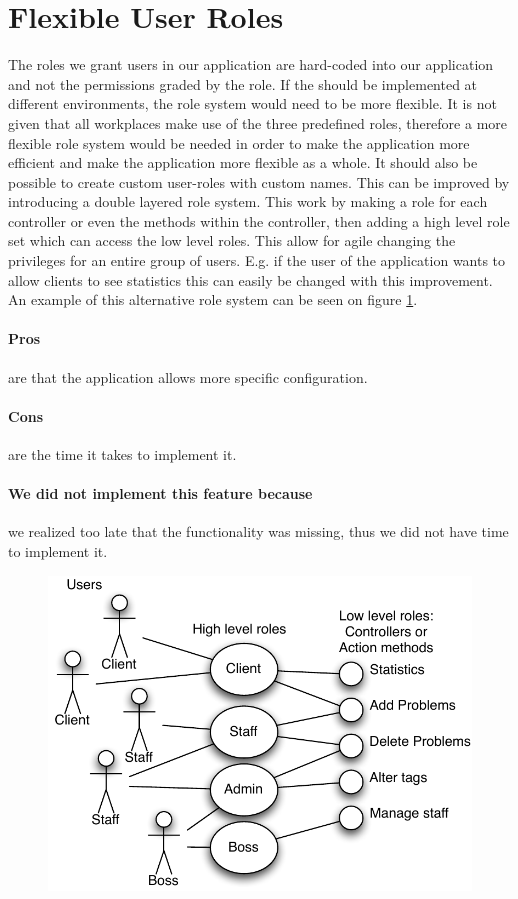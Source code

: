 \section{Flexible User Roles}
\label{sec:agile_roles}
The roles we grant users in our application are hard-coded into our application and not the permissions graded by the role.
If the \hdesk[] should be implemented at different environments, the role system would need to be more flexible. 
It is not given that all workplaces make use of the three predefined roles, therefore a more flexible role system would be needed in order to make the application more efficient and make the application more flexible as a whole.
It should also be possible to create custom user-roles with custom names.
This can be improved by introducing a double layered role system.  
This work by making a role for each controller or even the methods within the controller, then adding a high level role set which can access the low level roles. 
This allow for agile changing the privileges for an entire group of users. 
E.g. if the user of the application wants to allow clients to see statistics this can easily be changed with this improvement. An example of this alternative role system can be seen on figure \ref{fig:improved_role_system}.

\paragraph{Pros} are that the application allows more specific configuration. 
\paragraph{Cons} are the time it takes to implement it.
\paragraph{We did not implement this feature because} we realized too late that the functionality was missing, thus we did not have time to implement it.

\begin{figure}
\begin{center}
\includegraphics[scale=1]{input/epilogue/improvements/improved_role_system.pdf}
\label{fig:improved_role_system}
\end{center}
\end{figure}
